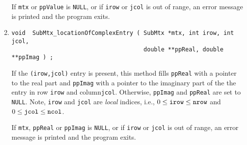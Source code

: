 \begin{enumerate}
If {\tt mtx} or {\tt ppValue} is {\tt NULL},
or if {\tt irow} or {\tt jcol} is out of range,
an error message is printed and the program exits.
\item
\begin{verbatim}
void  SubMtx_locationOfComplexEntry ( SubMtx *mtx, int irow, int jcol, 
                                      double **ppReal, double **ppImag ) ;
\end{verbatim}
If the {\tt (irow,jcol)} entry is present,
this method fills {\tt *ppReal} with a pointer to the real part and
{\tt *ppImag} with a pointer to the imaginary part of the the entry 
in row {\tt irow} and column{\tt jcol}.
Otherwise, {\tt *ppImag} and {\tt *ppReal} are set to {\tt NULL}.
Note, {\tt irow} and {\tt jcol} are {\it local} indices,
i.e., $0 \le \mbox{\tt irow} \le \mbox{\tt nrow}$
and $0 \le \mbox{\tt jcol} \le \mbox{\tt ncol}$.
\par {}
If {\tt mtx}, {\tt ppReal} or {\tt ppImag} is {\tt NULL},
or if {\tt irow} or {\tt jcol} is out of range,
an error message is printed and the program exits.
\end{enumerate}
\par
